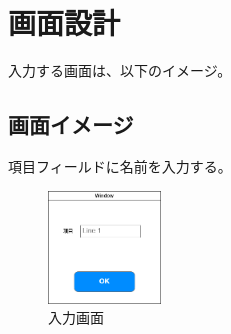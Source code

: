 \documentclass{ltjsarticle}
\begin{document}
\section{画面設計}
入力する画面は、以下のイメージ。
\subsection{画面イメージ}
項目フィールドに名前を入力する。
\begin{figure}[h]
    \begin{center}
        \includegraphics[width=3cm]{fig.png}
        \caption{入力画面}
    \end{center}
\end{figure}
\end{document}
